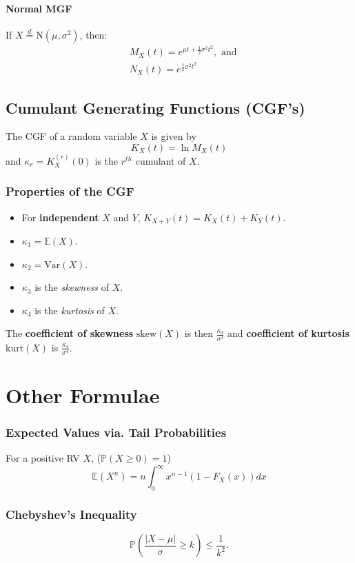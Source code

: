 \documentclass[titlepage,twocolumn]{article}
\begin{document}
\paragraph{Normal MGF}
If $X\stackrel{d}{=}\mbox{N}(\mu, \sigma^2)$, then:
\begin{align*}
    &M_X(t) = e^{\mu t + \frac{1}{2}\sigma^2t^2},\mbox{ and}\\
    &N_X(t) = e^{\frac{1}{2}\sigma^2t^2}
\end{align*}

\subsection*{Cumulant Generating Functions (CGF's)}
The CGF of a random variable $X$ is given by $$K_X(t) = \ln M_X(t)$$ and $\kappa_r = K_X^{(r)}(0)$ is the $r^{th}$ cumulant of $X$.
\subsubsection*{Properties of the CGF}
\begin{itemize}
    \item For \textbf{independent} $X$ and $Y$, $K_{X+Y}(t)=K_{X}(t)+K_{Y}(t)$.
    \item $\kappa_1 = \mathbb{E}(X)$.
    \item $\kappa_2 = \mbox{Var}(X)$.
    \item $\kappa_3$ is the \textit{skewness} of $X$.
    \item $\kappa_4$ is the \textit{kurtosis} of $X$.
\end{itemize}
The \textbf{coefficient of skewness} $\mbox{skew}(X)$ is then $\frac{\kappa_3}{\sigma^3}$ and \textbf{coefficient of kurtosis} $\mbox{kurt}(X)$ is $\frac{\kappa_4}{\sigma^4}$.

\section*{Other Formulae}
\subsubsection*{Expected Values via. Tail Probabilities}
For a positive RV $X$, ($\mathbb{P}(X\geq 0) = 1$)$$\mathbb{E}(X^n) = n \int_0^{\infty}x^{n-1}(1-F_X(x))dx$$
\subsubsection*{Chebyshev's Inequality}
$$\mathbb{P}\left(\frac{|X-\mu|}{\sigma} \geq k\right) \leq \frac{1}{k^2}.$$
\end{document}
